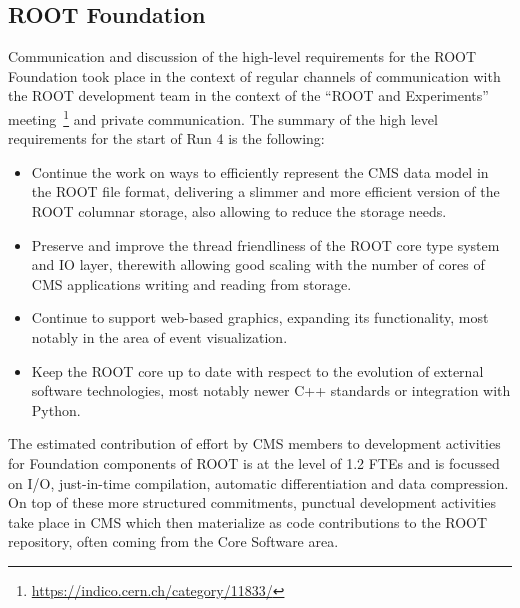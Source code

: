 \subsection{ROOT Foundation}
Communication and discussion of the high-level requirements for the ROOT Foundation took place in the context of regular channels of communication with the ROOT development team in the context of the ``ROOT and Experiments'' meeting~\footnote{\url{https://indico.cern.ch/category/11833/}} and private communication. 
The summary of the high level requirements for the start of Run 4 is the following:
\begin{itemize}
    \item Continue the work on ways to efficiently represent the CMS data model in the ROOT file format, delivering a slimmer and more efficient version of the ROOT columnar storage, also allowing to reduce the storage needs.
    \item Preserve and improve the thread friendliness of the ROOT core type system and IO layer, therewith allowing good scaling with the number of cores of CMS applications writing and reading from storage.
    \item Continue to support web-based graphics, expanding its functionality, most notably in the area of event visualization.
    \item Keep the ROOT core up to date with respect to the evolution of external software technologies, most notably newer C++ standards or integration with Python.
\end{itemize}

The estimated contribution of effort by CMS members to development activities for Foundation components of ROOT is at the level of 1.2 FTEs and is focussed on I/O, just-in-time compilation, automatic differentiation and data compression.
On top of these more structured commitments, punctual development activities take place in CMS which then materialize as code contributions to the ROOT repository, often coming from the Core Software area.


